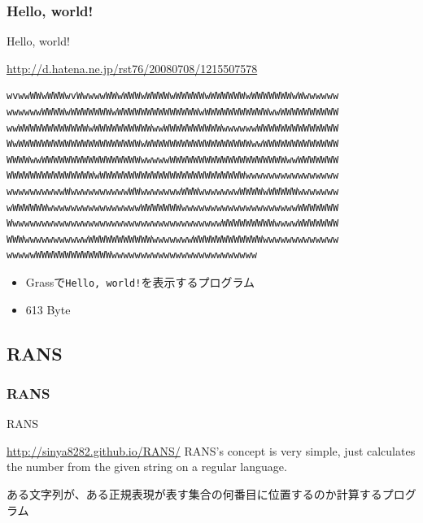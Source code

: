 \documentclass[12pt, unicode, svgnames]{beamer}
\begin{document}
\begin{frame}[fragile]
  \frametitle{Hello, world!}

  \begin{exampleblock}{Hello, world!}
    \begin{shadequote}[r]{\scriptsize\url{http://d.hatena.ne.jp/rst76/20080708/1215507578}}
\begin{lstlisting}[style=grass]
wvwwWWwWWWwvWwwwwWWwWWWwWWWWwWWWWWwWWWWWWwWWWWWWWwWwwwwww
wwwwwwWWWWwWWWWWWWwWWWWWWWWWWWWWWwWWWWWWWWWWWwwWWWWWWWWWW
wwWWWWWWWWWWWWwWWWWWWWWWWwwWWWWWWWWWWwwwwwwWWWWWWWWWWWWWW
WwWWWWWWWWWWWWWWWWWWWWWwWWWWWWWWWWWWWWWWWWwwWWWWWWWWWWWWW
WWWWwwWWWWWWWWWWWWWWWWWwwwwwWWWWWWWWWWWWWWWWWWWWwwWWWWWWW
WWWWWWWWWWWWWWWwWWWWWWWWWWWWWWWWWWWWWWWWWwwwwwwwwwwwwwwww
wwwwwwwwwwWwwwwwwwwwwWWwwwwwwwWWWwwwwwwwWWWWwWWWWWwwwwwww
wWWWWWWwwwwwwwwwwwwwwwwWWWWWWWwwwwwwwwwwwwwwwwwwwwWWWWWWW
WwwwwwwwwwwwwwwwwwwwwwwwwwwwwwwwwwwwwWWWWWWWWWwwwwWWWWWWW
WWWwwwwwwwwwwwWWWWWWWWWWWwwwwwwwWWWWWWWWWWWWwwwwwwwwwwwww
wwwwwWWWWWWWWWWWWWwwwwwwwwwwwwwwwwwwwwwwwww
\end{lstlisting}
    \end{shadequote}
  \end{exampleblock}

  \begin{itemize}
    \item<2-> Grassで\texttt{Hello, world!}を表示するプログラム
    \item<3-> 613 Byte
  \end{itemize}
\end{frame}

\subsection{RANS}
\begin{frame}[fragile]
  \frametitle{RANS}

  \begin{block}{RANS}
    \begin{shadequote}[r]{\scriptsize\url{http://sinya8282.github.io/RANS/}}
      RANS's concept is very simple, just calculates the number from the given string on a regular language.
    \end{shadequote}
  \end{block}

   {
    ある文字列が、ある正規表現が表す集合の何番目に位置するのか計算するプログラム
  }
\end{frame}
\end{document}

